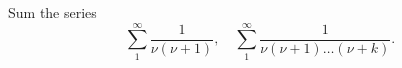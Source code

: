 Sum the series
\[
\sum_{1}^{\infty} \frac{1}{\nu(\nu + 1)},\quad
\sum_{1}^{\infty} \frac{1}{\nu(\nu + 1)\dots(\nu + k)}.
\]

